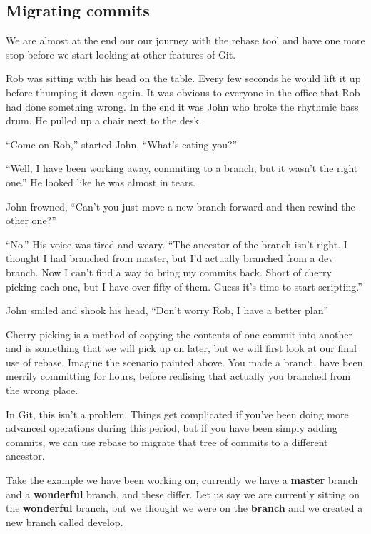 \subsection{Migrating commits}

We are almost at the end our our journey with the rebase tool and have one more stop before we start looking at other features of Git.  

\begin{trenches}
Rob was sitting with his head on the table.  Every few seconds he would lift it up before thumping it down again.  It was obvious to everyone in the office that Rob had done something wrong.  In the end it was John who broke the rhythmic bass drum.  He pulled up a chair next to the desk.

``Come on Rob,'' started John, ``What's eating you?''

``Well, I have been working away, commiting to a branch, but it wasn't the right one.''  He looked like he was almost in tears.

John frowned, ``Can't you just move a new branch forward and then rewind the other one?''

``No.''  His voice was tired and weary.  ``The ancestor of the branch isn't right.  I thought I had branched from master, but I'd actually branched from a dev branch.  Now I can't find a way to bring my commits back.  Short of cherry picking each one, but I have over fifty of them.  Guess it's time to start scripting.''

John smiled and shook his head, ``Don't worry Rob, I have a better plan''
\end{trenches}

Cherry picking is a method of copying the contents of one commit into another and is something that we will pick up on later, but we will first look at our final use of rebase.  Imagine the scenario painted above.  You made a branch, have been merrily committing for hours, before realising that actually you branched from the wrong place.

In Git, this isn't a problem.  Things get complicated if you've been doing more advanced operations during this period, but if you have been simply adding commits, we can use rebase to migrate that tree of commits to a different ancestor.

Take the example we have been working on, currently we have a \textbf{master} branch and a \textbf{wonderful} branch, and these differ.  Let us say we are currently sitting on the \textbf{wonderful} branch, but we thought we were on the \textbf{branch} and we created a new branch called develop.

